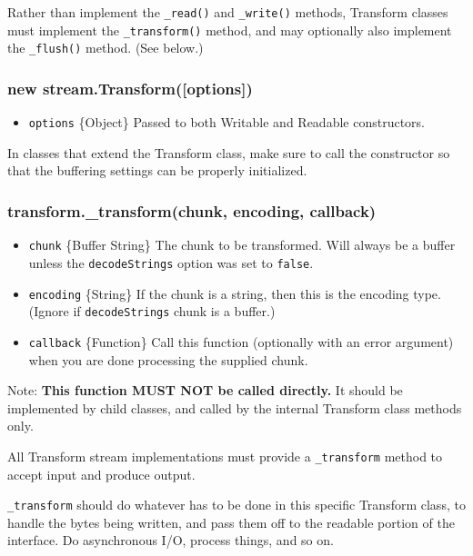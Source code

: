 Rather than implement the \texttt{\_read()} and \texttt{\_write()}
methods, Transform classes must implement the \texttt{\_transform()}
method, and may optionally also implement the \texttt{\_flush()} method.
(See below.)

\subsubsection{new stream.Transform({[}options{]})}

\begin{itemize}
\item
  \texttt{options} \{Object\} Passed to both Writable and Readable
  constructors.
\end{itemize}

In classes that extend the Transform class, make sure to call the
constructor so that the buffering settings can be properly initialized.

\subsubsection{transform.\_transform(chunk, encoding, callback)}

\begin{itemize}
\item
  \texttt{chunk} \{Buffer \textbar{} String\} The chunk to be
  transformed. Will always be a buffer unless the \texttt{decodeStrings}
  option was set to \texttt{false}.
\item
  \texttt{encoding} \{String\} If the chunk is a string, then this is
  the encoding type. (Ignore if \texttt{decodeStrings} chunk is a
  buffer.)
\item
  \texttt{callback} \{Function\} Call this function (optionally with an
  error argument) when you are done processing the supplied chunk.
\end{itemize}

Note: \textbf{This function MUST NOT be called directly.} It should be
implemented by child classes, and called by the internal Transform class
methods only.

All Transform stream implementations must provide a \texttt{\_transform}
method to accept input and produce output.

\texttt{\_transform} should do whatever has to be done in this specific
Transform class, to handle the bytes being written, and pass them off to
the readable portion of the interface. Do asynchronous I/O, process
things, and so on.

